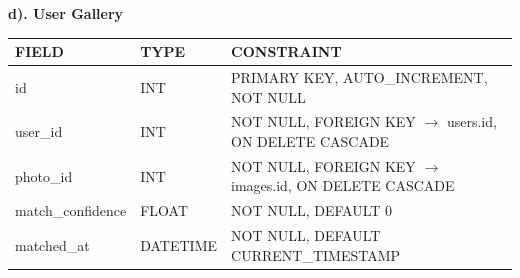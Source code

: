 \vspace{0.2cm}
\noindent\textbf{d). User Gallery}
\vspace{0.2cm}
\begin{center}
    \renewcommand{\arraystretch}{1.3}
    \begin{tabular}{|>{\raggedright\arraybackslash}p{3.0cm}|>{\raggedright\arraybackslash}p{4.5cm}|>{\raggedright\arraybackslash}p{8.5cm}|}
        \hline
        \rowcolor{lightgray!50}
        \textbf{FIELD}    & \textbf{TYPE} & \textbf{CONSTRAINT}                                              \\ \hline
        id                & INT           & PRIMARY KEY, AUTO\_INCREMENT, NOT NULL                           \\ \hline
        user\_id          & INT           & NOT NULL, FOREIGN KEY $\rightarrow$ users.id, ON DELETE CASCADE  \\ \hline
        photo\_id         & INT           & NOT NULL, FOREIGN KEY $\rightarrow$ images.id, ON DELETE CASCADE \\ \hline
        match\_confidence & FLOAT         & NOT NULL, DEFAULT 0                                              \\ \hline
        matched\_at       & DATETIME      & NOT NULL, DEFAULT CURRENT\_TIMESTAMP                             \\ \hline
    \end{tabular}
\end{center}


